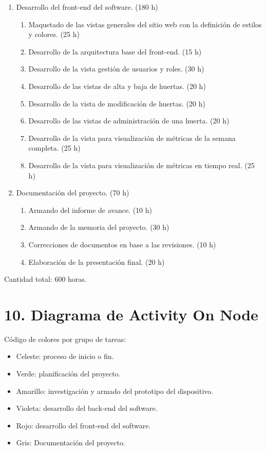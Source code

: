 \documentclass[
11pt, %
codirector, %
]{charter}
\begin{document}
\begin{enumerate}
\item Desarrollo del front-end del software. (180 h)
	\begin{enumerate}
	\item Maquetado de las vistas generales del sitio web con la definición de estilos y colores. (25 h)
	\item Desarrollo de la arquitectura base del front-end. (15 h)
	\item Desarrollo de la vista gestión de usuarios y roles. (30 h)
	\item Desarrollo de las vistas de alta y baja de huertas. (20 h)
	\item Desarrollo de la vista de modificación de huertas. (20 h)
	\item Desarrollo de las vistas de administración de una huerta. (20 h)
	\item Desarrollo de la vista para visualización de métricas de la semana completa. (25 h)
	\item Desarrollo de la vista para visualización de métricas en tiempo real. (25 h)
	\end{enumerate}

\item Documentación del proyecto. (70 h)
	\begin{enumerate}
	\item Armando del informe de avance. (10 h)
	\item Armando de la memoria del proyecto. (30 h)
	\item Correcciones de documentos en base a las revisiones. (10 h)
	\item Elaboración de la presentación final. (20 h)
	\end{enumerate}	
	
\end{enumerate}

Cantidad total: 600 horas.

\section{10. Diagrama de Activity On Node}
\label{sec:AoN}

Código de colores por grupo de tareas:
\begin{itemize}
	\item Celeste: proceso de inicio o fin.
	\item Verde: planificación del proyecto.
	\item Amarillo: investigación y armado del prototipo del dispositivo.
	\item Violeta: desarrollo del back-end del software.
	\item Rojo: desarrollo del front-end del software. 
	\item Gris: Documentación del proyecto.
\end{itemize}
\end{document}
